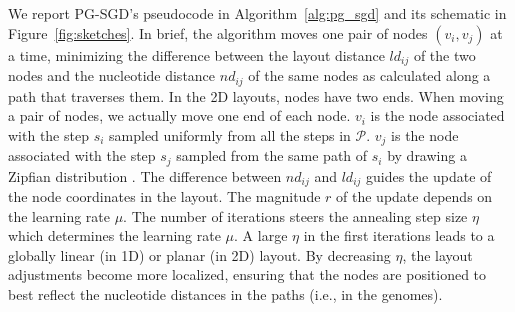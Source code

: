 \documentclass{bioinfo}
\theoremstyle{definition}
\begin{document}
	We report PG-SGD's pseudocode in Algorithm~\ref{alg:pg_sgd} and its schematic in Figure~\ref{fig:sketches}.
	In brief, the algorithm moves one pair of nodes $( v_i, v_j )$ at a time, minimizing the difference between the layout distance $ld_{ij}$ of the two nodes and the nucleotide distance $nd_{ij}$ of the same nodes as calculated along a path that traverses them.
	In the 2D layouts, nodes have two ends.
	When moving a pair of nodes, we actually move one end of each node.
	$v_i$ is the node associated with the step $s_i$ sampled uniformly from all the steps in $\mathcal{P}$.
	$v_j$ is the node associated with the step $s_j$ sampled from the same path of $s_i$ by drawing a Zipfian distribution \citep{Zipf1932}.
	The difference between $nd_{ij}$ and $ld_{ij}$ guides the update of the node coordinates in the layout.
	The magnitude $r$ of the update depends on the learning rate $\mu$.
	The number of iterations steers the annealing step size $\eta$ which determines the learning rate $\mu$.
	A large $\eta$ in the first iterations leads to a globally linear (in 1D) or planar (in 2D) layout.
	By decreasing $\eta$, the layout adjustments become more localized, ensuring that the nodes are positioned to best reflect the nucleotide distances in the paths (i.e., in the genomes).

	

\end{document}
